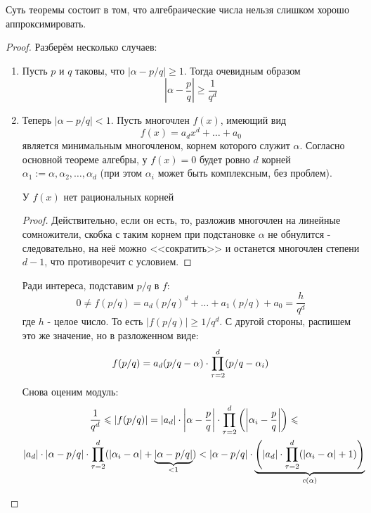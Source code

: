 \begin{note}
	Суть теоремы состоит в том, что алгебраические числа нельзя слишком хорошо аппроксимировать.
\end{note}

\begin{proof}
	Разберём несколько случаев:
	\begin{enumerate}
		\item Пусть $p$ и $q$ таковы, что $|\alpha - p/q| \ge 1$. Тогда очевидным образом
		\[
			\left|\alpha - \frac{p}{q}\right| \ge \frac{1}{q^d}
		\]
		
		\item Теперь $|\alpha - p/q| < 1$. Пусть многочлен $f(x)$, имеющий вид
		\[
			f(x) = a_d x^d + \ldots + a_0
		\]
		является минимальным многочленом, корнем которого служит $\alpha$. Согласно основной теореме алгебры, у $f(x) = 0$ будет ровно $d$ корней $\alpha_1 := \alpha, \alpha_2, \ldots, \alpha_d$ (при этом $\alpha_i$ может быть комплексным, без проблем).
		\begin{proposition}
			У $f(x)$ нет рациональных корней
		\end{proposition}
		
		\begin{proof}
			Действительно, если он есть, то, разложив многочлен на линейные сомножители, скобка с таким корнем при подстановке $\alpha$ не обнулится - следовательно, на неё можно <<сократить>> и останется многочлен степени $d - 1$, что противоречит с условием.
		\end{proof}
	
		Ради интереса, подставим $p/q$ в $f$:
		\[
			0 \neq f(p/q) = a_d (p/q)^d + \ldots + a_1 (p/q) + a_0 = \frac{h}{q^d}
		\]
		где $h$ - целое число. То есть $|f(p/q)| \ge 1/q^d$. С другой стороны, распишем это же значение, но в разложенном виде:
		\[
			f(p/q) = a_d (p/q - \alpha) \cdot \prod\limits_{\tau = 2}^d (p/q - \alpha_i)
		\]
		Снова оценим модуль:
		\begin{multline*}
			\frac{1}{q^d} \leqslant |f(p/q)| = |a_d| \cdot \left|\alpha - \frac{p}{q}\right| \cdot \prod\limits_{\tau = 2}^d \left(\left|\alpha_i - \frac{p}{q}\right|\right) \leqslant
			\\
			|a_d| \cdot |\alpha - p/q| \cdot \prod\limits_{\tau = 2}^d (|\alpha_i - \alpha| + \underbrace{|\alpha - p/q|}_{< 1}) < |\alpha - p/q| \cdot \underbrace{\left(|a_d| \cdot \prod\limits_{\tau = 2}^d (|\alpha_i - \alpha| + 1)\right)}_{c(\alpha)}
		\end{multline*}
	\end{enumerate}
\end{proof}

